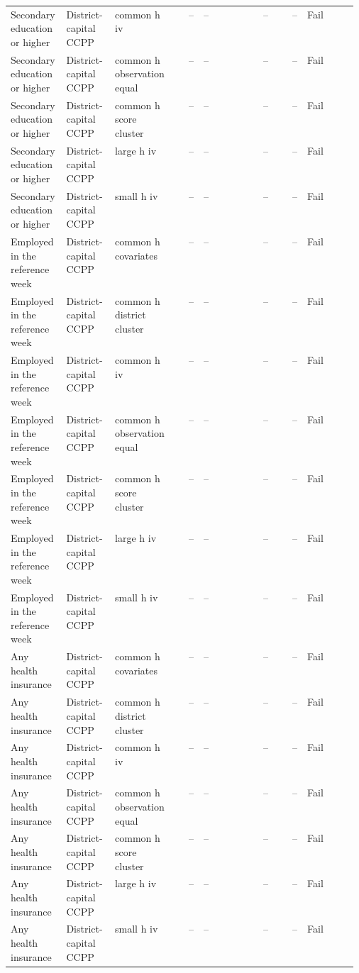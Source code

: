 \begin{longtable}{@{}p{0.16\linewidth}p{0.14\linewidth}p{0.14\linewidth}rp{0.13\linewidth}rrl@{}}
Secondary education or higher & District-capital CCPP & common h iv & -- & -- & -- & -- & Fail \\
Secondary education or higher & District-capital CCPP & common h observation equal & -- & -- & -- & -- & Fail \\
Secondary education or higher & District-capital CCPP & common h score cluster & -- & -- & -- & -- & Fail \\
Secondary education or higher & District-capital CCPP & large h iv & -- & -- & -- & -- & Fail \\
Secondary education or higher & District-capital CCPP & small h iv & -- & -- & -- & -- & Fail \\
Employed in the reference week & District-capital CCPP & common h covariates & -- & -- & -- & -- & Fail \\
Employed in the reference week & District-capital CCPP & common h district cluster & -- & -- & -- & -- & Fail \\
Employed in the reference week & District-capital CCPP & common h iv & -- & -- & -- & -- & Fail \\
Employed in the reference week & District-capital CCPP & common h observation equal & -- & -- & -- & -- & Fail \\
Employed in the reference week & District-capital CCPP & common h score cluster & -- & -- & -- & -- & Fail \\
Employed in the reference week & District-capital CCPP & large h iv & -- & -- & -- & -- & Fail \\
Employed in the reference week & District-capital CCPP & small h iv & -- & -- & -- & -- & Fail \\
Any health insurance & District-capital CCPP & common h covariates & -- & -- & -- & -- & Fail \\
Any health insurance & District-capital CCPP & common h district cluster & -- & -- & -- & -- & Fail \\
Any health insurance & District-capital CCPP & common h iv & -- & -- & -- & -- & Fail \\
Any health insurance & District-capital CCPP & common h observation equal & -- & -- & -- & -- & Fail \\
Any health insurance & District-capital CCPP & common h score cluster & -- & -- & -- & -- & Fail \\
Any health insurance & District-capital CCPP & large h iv & -- & -- & -- & -- & Fail \\
Any health insurance & District-capital CCPP & small h iv & -- & -- & -- & -- & Fail \\

\end{longtable}
